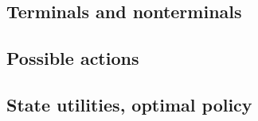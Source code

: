 \documentclass[letterpaper, 10pt, twocolumn]{article}
\numberwithin{theorem}{section}
\begin{document}
\subsection{Terminals and nonterminals}

\subsection{Possible actions}

\subsection{State utilities, optimal policy}

\end{document}
